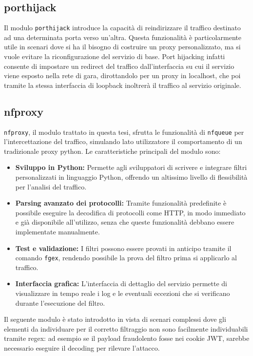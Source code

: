 \subsection{porthijack}
Il modulo \texttt{porthijack} introduce la capacità di reindirizzare il traffico destinato ad una determinata porta verso un’altra. Questa funzionalità è particolarmente utile in scenari dove si ha il bisogno di costruire un proxy personalizzato, ma si vuole evitare la riconfigurazione del servizio di base. Port hijacking infatti consente di impostare un redirect del traffico dall'interfaccia su cui il servizio viene esposto nella rete di gara, dirottandolo per un proxy in localhost, che poi tramite la stessa interfaccia di loopback inoltrerà il traffico al servizio originale.

\subsection{nfproxy}
\texttt{nfproxy}, il modulo trattato in questa tesi, sfrutta le funzionalità di \texttt{nfqueue} per l'intercettazione del traffico, simulando lato utilizzatore il comportamento di un tradizionale proxy python. Le caratteristiche principali del modulo sono:
\begin{itemize}
    \setlength{\itemsep}{1pt}
    \setlength{\parskip}{1pt}
    \item \textbf{Sviluppo in Python:} Permette agli sviluppatori di scrivere e integrare filtri personalizzati in linguaggio Python, offrendo un altissimo livello di flessibilità per l'analisi del traffico.
    \item \textbf{Parsing avanzato dei protocolli:} Tramite funzionalità predefinite è possibile eseguire la decodifica di protocolli come HTTP, in modo immediato e già disponibile all'utilizzo, senza che queste funzionalità debbano essere implementate manualmente.
    \item \textbf{Test e validazione:} I filtri possono essere provati in anticipo tramite il comando \texttt{fgex}, rendendo possibile la prova del filtro prima si applicarlo al traffico.
    \item \textbf{Interfaccia grafica:} L'interfaccia di dettaglio del servizio permette di visualizzare in tempo reale i log e le eventuali eccezioni che si verificano durante l'esecuzione del filtro.
\end{itemize}

Il seguente modulo è stato introdotto in vista di scenari complessi dove gli elementi da individuare per il corretto filtraggio non sono facilmente individuabili tramite regex: ad esempio se il payload fraudolento fosse nei cookie JWT, sarebbe necessario eseguire il decoding per rilevare l'attacco.

